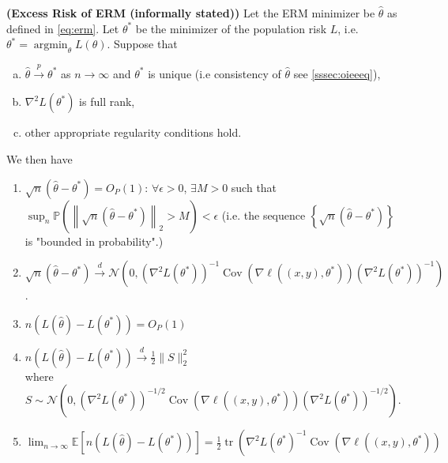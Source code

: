 \documentclass{article}
\newcommand{\bfs}[1]{\textbf{({#1}) }}
\begin{document}
\begin{thma}\bfs{Excess Risk  of ERM (informally stated)}\label{thm:ererm}
Let the ERM minimizer be $\hat{\theta}$ as defined in \cref{eq:erm}. Let $\theta^{*}$ be the minimizer of the population risk $L$, i.e. $\theta^{*}=\operatorname{argmin}_{\theta} L(\theta) .$ Suppose that \begin{enumerate}[a).]
    \item $\hat{\theta} \stackrel{p}{\rightarrow} \theta^{*}$ as $n \rightarrow \infty$ and $\theta^{*}$ is unique (i.e consistency of $\hat{\theta}$ see \cref{sssec:oieeeq}),
    \item  $\nabla^{2} L\left(\theta^{*}\right)$ is full rank,
    \item  other appropriate regularity conditions hold.
\end{enumerate}
We then have
\begin{enumerate}
    \item $\sqrt{n}\left(\hat{\theta}-\theta^{*}\right)=O_{P}(1)$: $\forall \epsilon>0$, $\exists M>0$ such that $\sup _{n} \mathbb{P}\left(\left\|\sqrt{n}\left(\hat{\theta}-\theta^{*}\right)\right\|_{2}>M\right)<\epsilon$ (i.e. the sequence $\left\{\sqrt{n}\left(\hat{\theta}-\theta^{*}\right)\right\}$ is "bounded in probability".)
    \item $\sqrt{n}\left(\hat{\theta}-\theta^{*}\right) \stackrel{d}{\rightarrow} \mathcal{N}\left(0,\left(\nabla^{2} L\left(\theta^{*}\right)\right)^{-1} \operatorname{Cov}\left(\nabla\ell\left((x, y), \theta^{*}\right)\right)\left(\nabla^{2} L\left(\theta^{*}\right)\right)^{-1}\right)$.
    \item  $n\left(L(\hat{\theta})-L\left(\theta^{*}\right)\right)=O_{P}(1)$
    \item $n\left(L(\hat{\theta})-L\left(\theta^{*}\right)\right) \stackrel{d}{\rightarrow} \frac{1}{2}\|S\|_{2}^{2}$ \\
    where $S \sim \mathcal{N}\left(0,\left(\nabla^{2} L\left(\theta^{*}\right)\right)^{-1 / 2} \operatorname{Cov}\left(\nabla\ell\left((x, y), \theta^{*}\right)\right)\left(\nabla^{2} L\left(\theta^{*}\right)\right)^{-1 / 2}\right)$.
    \item $\lim _{n \rightarrow \infty} \mathbb{E}\left[n\left(L(\hat{\theta})-L\left(\theta^{*}\right)\right)\right]=\frac{1}{2} \operatorname{tr}\left(\nabla^{2} L\left(\theta^{*}\right)^{-1} \operatorname{Cov}\left(\nabla \ell\left((x, y), \theta^{*}\right)\right)\right.$
\end{enumerate}
\end{thma}
\end{document}
